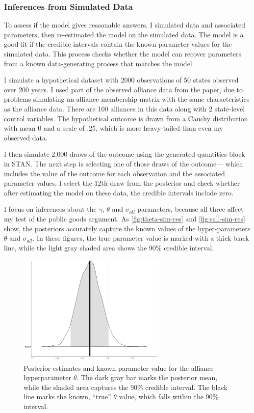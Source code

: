 \documentclass[12pt]{article}
\begin{document}
\subsubsection{Inferences from Simulated Data}


To assess if the model gives reasonable answers, I simulated data and associated parameters, then re-estimated the model on the simulated data.
The model is a good fit if the credible intervals contain the known parameter values for the simulated data. 
This process checks whether the model can recover parameters from a known data-generating process that matches the model. 


I simulate a hypothetical dataset with 2000 observations of 50 states observed over 200 years.
I used part of the observed alliance data from the paper, due to problems simulating an alliance membership matrix with the same characteristics as the alliance data. 
There are 100 alliances in this data along with 2 state-level control variables. 
The hypothetical outcome is drawn from a Cauchy distribution with mean 0 and a scale of .25, which is more heavy-tailed than even my observed data. 


I then simulate 2,000 draws of the outcome using the generated quantities block in STAN. 
The next step is selecting one of those draws of the outcome--- which includes the value of the outcome for each observation and the associated parameter values. 
I select the 12th draw from the posterior and check whether after estimating the model on these data, the credible intervals include zero. 


I focus on inferences about the $\gamma$, $\theta$ and $\sigma_{all}$ parameters, because all three affect my test of the public goods argument. 
As \autoref{fig:theta-sim-res} and \autoref{fig:sall-sim-res} show, the posteriors accurately capture the known values of the hyper-parameters $\theta$ and $\sigma_{all}$. 
In these figures, the true parameter value is marked with a thick black line, while the light gray shaded area shows the 90\% credible interval. 


\begin{figure}[htbp]
	\centering
		\includegraphics[width=0.65\textwidth]{theta-sim-res.png}
	\caption{Posterior estimates and known parameter value for the alliance hyperparameter $\theta$. The dark gray bar marks the posterior mean, while the shaded area captures the 90\% credible interval. The black line marks the known, ``true'' $\theta$ value, which falls within the 90\% interval.}
	\label{fig:theta-sim-res}
\end{figure}
\end{document}

